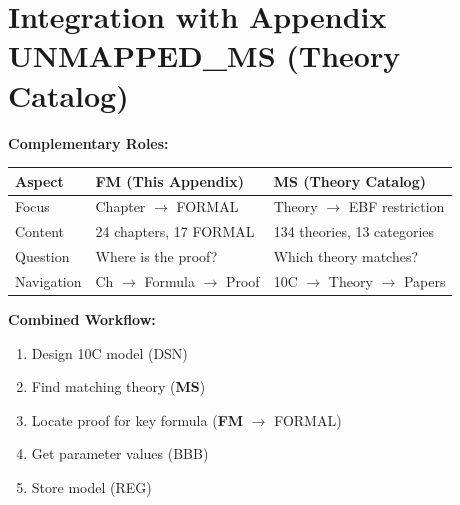 \section{Integration with Appendix UNMAPPED_MS (Theory Catalog)}
\label{sec:fm-ms-integration}

\begin{tcolorbox}[colback=purple!3!white, colframe=purple!60!black,
    title=\textbf{FM $\leftrightarrow$ MS Integration}]

\textbf{Complementary Roles:}

\begin{center}
\begin{tabular}{|l|l|l|}
\hline
\textbf{Aspect} & \textbf{FM (This Appendix)} & \textbf{MS (Theory Catalog)} \\
\hline
\hline
Focus & Chapter $\rightarrow$ FORMAL & Theory $\rightarrow$ EBF restriction \\
Content & 24 chapters, 17 FORMAL & 134 theories, 13 categories \\
Question & Where is the proof? & Which theory matches? \\
Navigation & Ch $\rightarrow$ Formula $\rightarrow$ Proof & 10C $\rightarrow$ Theory $\rightarrow$ Papers \\
\hline
\end{tabular}
\end{center}

\vspace{0.5em}

\textbf{Combined Workflow:}
\begin{enumerate}[nosep]
    \item Design 10C model (DSN)
    \item Find matching theory (\textbf{MS})
    \item Locate proof for key formula (\textbf{FM} $\rightarrow$ FORMAL)
    \item Get parameter values (BBB)
    \item Store model (REG)
\end{enumerate}

\end{tcolorbox}

